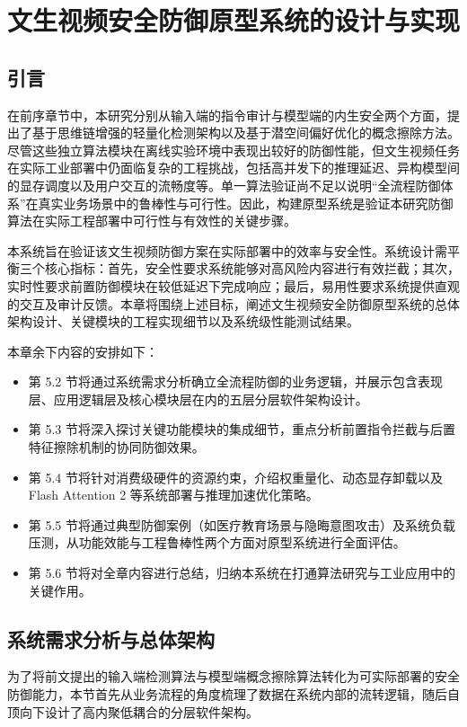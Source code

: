 \chapter{文生视频安全防御原型系统的设计与实现}

\section{引言}

在前序章节中，本研究分别从输入端的指令审计与模型端的内生安全两个方面，提出了基于思维链增强的轻量化检测架构以及基于潜空间偏好优化的概念擦除方法。尽管这些独立算法模块在离线实验环境中表现出较好的防御性能，但文生视频任务在实际工业部署中仍面临复杂的工程挑战，包括高并发下的推理延迟、异构模型间的显存调度以及用户交互的流畅度等。单一算法验证尚不足以说明“全流程防御体系”在真实业务场景中的鲁棒性与可行性。因此，构建原型系统是验证本研究防御算法在实际工程部署中可行性与有效性的关键步骤。

本系统旨在验证该文生视频防御方案在实际部署中的效率与安全性。系统设计需平衡三个核心指标：首先，安全性要求系统能够对高风险内容进行有效拦截；其次，实时性要求前置防御模块在较低延迟下完成响应；最后，易用性要求系统提供直观的交互及审计反馈。本章将围绕上述目标，阐述文生视频安全防御原型系统的总体架构设计、关键模块的工程实现细节以及系统级性能测试结果。

本章余下内容的安排如下：
\begin{itemize}
    \item 第 5.2 节将通过系统需求分析确立全流程防御的业务逻辑，并展示包含表现层、应用逻辑层及核心模块层在内的五层分层软件架构设计。
    \item 第 5.3 节将深入探讨关键功能模块的集成细节，重点分析前置指令拦截与后置特征擦除机制的协同防御效果。
    \item 第 5.4 节将针对消费级硬件的资源约束，介绍权重量化、动态显存卸载以及 Flash Attention 2 等系统部署与推理加速优化策略。
    \item 第 5.5 节将通过典型防御案例（如医疗教育场景与隐晦意图攻击）及系统负载压测，从功能效能与工程鲁棒性两个方面对原型系统进行全面评估。
    \item 第 5.6 节将对全章内容进行总结，归纳本系统在打通算法研究与工业应用中的关键作用。
\end{itemize}

\section{系统需求分析与总体架构}

为了将前文提出的输入端检测算法与模型端概念擦除算法转化为可实际部署的安全防御能力，本节首先从业务流程的角度梳理了数据在系统内部的流转逻辑，随后自顶向下设计了高内聚低耦合的分层软件架构。

